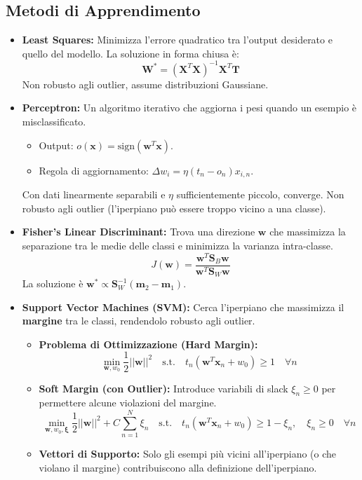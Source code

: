 \documentclass[a4paper,11pt]{article}
\begin{document}
\subsection{Metodi di Apprendimento}
\begin{itemize}
    \item \textbf{Least Squares:} Minimizza l'errore quadratico tra l'output desiderato e quello del modello. La soluzione in forma chiusa è:
    \begin{equation}
        \mathbf{W}^* = (\mathbf{X}^T \mathbf{X})^{-1} \mathbf{X}^T \mathbf{T}
    \end{equation}
    Non robusto agli outlier, assume distribuzioni Gaussiane.
    \item \textbf{Perceptron:} Un algoritmo iterativo che aggiorna i pesi quando un esempio è misclassificato.
    \begin{itemize}
        \item Output: $o(\mathbf{x}) = \text{sign}(\mathbf{w}^T \mathbf{x})$.
        \item Regola di aggiornamento: $\Delta w_i = \eta (t_n - o_n) x_{i,n}$.
    \end{itemize}
    Con dati linearmente separabili e $\eta$ sufficientemente piccolo, converge. Non robusto agli outlier (l'iperpiano può essere troppo vicino a una classe).
    \item \textbf{Fisher's Linear Discriminant:} Trova una direzione $\mathbf{w}$ che massimizza la separazione tra le medie delle classi e minimizza la varianza intra-classe.
    \begin{equation}
        J(\mathbf{w}) = \frac{\mathbf{w}^T \mathbf{S}_B \mathbf{w}}{\mathbf{w}^T \mathbf{S}_W \mathbf{w}}
    \end{equation}
    La soluzione è $\mathbf{w}^* \propto \mathbf{S}_W^{-1} (\mathbf{m}_2 - \mathbf{m}_1)$.
    \item \textbf{Support Vector Machines (SVM):} Cerca l'iperpiano che massimizza il \textbf{margine} tra le classi, rendendolo robusto agli outlier.
    \begin{itemize}
        \item \textbf{Problema di Ottimizzazione (Hard Margin):}
        \begin{equation}
            \min_{\mathbf{w}, w_0} \frac{1}{2} ||\mathbf{w}||^2 \quad \text{s.t.} \quad t_n(\mathbf{w}^T \mathbf{x}_n + w_0) \ge 1 \quad \forall n
        \end{equation}
        \item \textbf{Soft Margin (con Outlier):} Introduce variabili di slack $\xi_n \ge 0$ per permettere alcune violazioni del margine.
        \begin{equation}
            \min_{\mathbf{w}, w_0, \bm{\xi}} \frac{1}{2} ||\mathbf{w}||^2 + C \sum_{n=1}^N \xi_n \quad \text{s.t.} \quad t_n(\mathbf{w}^T \mathbf{x}_n + w_0) \ge 1 - \xi_n, \quad \xi_n \ge 0 \quad \forall n
        \end{equation}
        \item \textbf{Vettori di Supporto:} Solo gli esempi più vicini all'iperpiano (o che violano il margine) contribuiscono alla definizione dell'iperpiano.
    \end{itemize}
\end{itemize}
\end{document}

